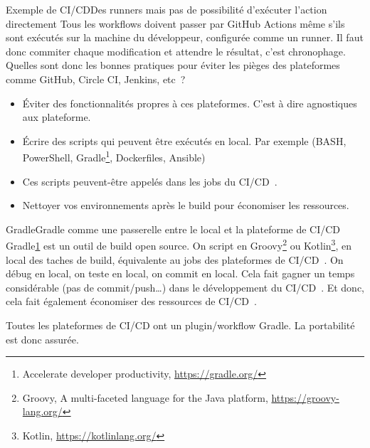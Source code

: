 \documentclass{beamer}
\begin{document}
    \begin{frame}{Exemple de CI/CD}{Des runners mais pas de possibilité d'exécuter l'action directement}
        \transdissolve
        Tous les workflows doivent passer par GitHub Actions même s'ils sont exécutés sur la machine du développeur, configurée comme un runner.
        Il faut donc commiter chaque modification et attendre le résultat, c'est chronophage.
        \bigbreak
        Quelles sont donc les bonnes pratiques pour éviter les pièges des plateformes comme GitHub, Circle CI, Jenkins, etc~?
        \pause
        \begin{itemize}
            \item Éviter des fonctionnalités propres à ces plateformes.
            C'est à dire agnostiques aux plateforme.
            \item Écrire des scripts qui peuvent être exécutés en local.
            Par exemple (BASH, PowerShell, Gradle\footnote{\label{gradle}Accelerate developer productivity, \url{https://gradle.org/}}, Dockerfiles, Ansible)
            \item Ces scripts peuvent-être appelés dans les jobs du CI/CD~.
            \item Nettoyer vos environnements après le build pour économiser les ressources.
        \end{itemize}
    \end{frame}

    \begin{frame}{Gradle}{Gradle comme une passerelle entre le local et la plateforme de CI/CD}
        \transdissolve
        Gradle\cref{gradle} est un outil de build open source.
        On script en Groovy\footnote{\label{groovy}Groovy, A multi-faceted language for the Java platform, \url{https://groovy-lang.org/}} ou Kotlin\footnote{Kotlin, \url{https://kotlinlang.org/}}, en local des taches de build, équivalente au jobs des plateformes de CI/CD~.
        \bigbreak
        On débug en local, on teste en local, on commit en local.
        Cela fait gagner un temps considérable (pas de commit/push\ldots) dans le développement du CI/CD~.
        Et donc, cela fait également économiser des ressources de CI/CD~.
        \begin{dangercolorbox}
            Toutes les plateformes de CI/CD ont un plugin/workflow Gradle.
            La portabilité est donc assurée.
        \end{dangercolorbox}
    \end{frame}
\end{document}
